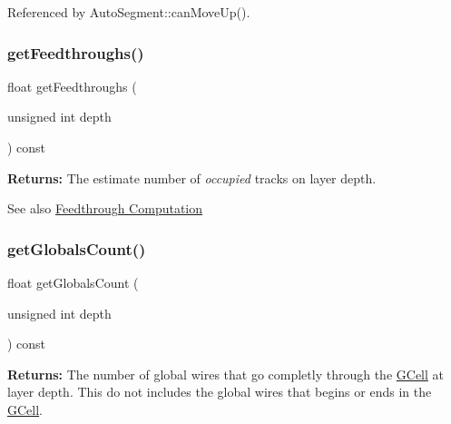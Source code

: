 Referenced by Auto\+Segment\+::can\+Move\+Up().

\mbox{\label{classKatabatic_1_1GCell_a14feed45699c8dc406251519dc08bc79}} 
\subsubsection{\texorpdfstring{get\+Feedthroughs()}{getFeedthroughs()}}
{\footnotesize\ttfamily float get\+Feedthroughs (\begin{DoxyParamCaption}\item[{unsigned int}]{depth }\end{DoxyParamCaption}) const\hspace{0.3cm}{\ttfamily [inline]}}

{\bfseries Returns\+:} The estimate number of {\itshape occupied} tracks on layer {\ttfamily depth}.

\begin{DoxySeeAlso}{See also}
\hyperlink{classKatabatic_1_1GCell_secGCellFeedthrough}{Feedthrough Computation} 
\end{DoxySeeAlso}
\mbox{\label{classKatabatic_1_1GCell_a4785bcc49da76fc38f6940f5b1cc5b17}} 
\subsubsection{\texorpdfstring{get\+Globals\+Count()}{getGlobalsCount()}}
{\footnotesize\ttfamily float get\+Globals\+Count (\begin{DoxyParamCaption}\item[{unsigned int}]{depth }\end{DoxyParamCaption}) const\hspace{0.3cm}{\ttfamily [inline]}}

{\bfseries Returns\+:} The number of global wires that go completly through the \hyperlink{classKatabatic_1_1GCell}{G\+Cell} at layer {\ttfamily depth}. This do not includes the global wires that begins or ends in the \hyperlink{classKatabatic_1_1GCell}{G\+Cell}. \mbox{\label{classKatabatic_1_1GCell_a81575302a8794958c310dc101807e9c5}} 
